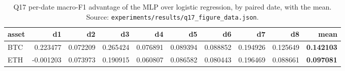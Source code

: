 \begin{table}[h]\centering
\caption{Q17 per-date macro-F1 advantage of the MLP over logistic regression, by paired date,
with the mean. Source: \texttt{experiments/results/q17\_figure\_data.json}.}
\label{tab:q17days}
\begin{tabular}{lrrrrrrrrr}
\toprule
asset & d1 & d2 & d3 & d4 & d5 & d6 & d7 & d8 & mean \\
\midrule
BTC & 0.223477 & 0.072209 & 0.265424 & 0.076891 & 0.089394 & 0.088852 & 0.194926 & 0.125649 & \textbf{0.142103} \\
ETH & -0.001203 & 0.073973 & 0.190915 & 0.060807 & 0.086582 & 0.080443 & 0.196469 & 0.088661 & \textbf{0.097081} \\
\bottomrule
\end{tabular}\end{table}
